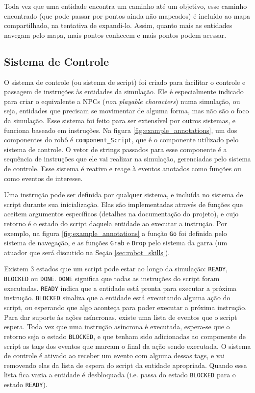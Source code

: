 Toda vez que uma entidade encontra um caminho até um objetivo, esse caminho encontrado (que pode passar por pontos ainda não mapeados) é incluído ao mapa compartilhado, na tentativa de expandi-lo. Assim, quanto mais as entidades navegam pelo mapa, mais pontos conhecem e mais pontos podem acessar.

\subsection{Sistema de Controle}
\label{sec:scripting}

O sistema de controle (ou sistema de script) foi criado para facilitar o controle e passagem de instruções às entidades da simulação. Ele é especialmente indicado para criar o equivalente a NPCs (\textit{non playable characters}) numa simulação, ou seja, entidades que precisam se movimentar de alguma forma, mas não são o foco da simulação. Esse sistema foi feito para ser extensível por outros sistemas, e funciona baseado em instruções. Na figura \ref{fig:example_annotations}, um dos componentes do robô é \texttt{component\_Script}, que é o componente utilizado pelo sistema de controle. O vetor de strings passados para esse componente é a sequência de instruções que ele vai realizar na simulação, gerenciadas pelo sistema de controle. Esse sistema é reativo e reage à eventos anotados como funções ou como eventos de interesse.

Uma instrução pode ser definida por qualquer sistema, e incluída no sistema de script durante sua inicialização. Elas são implementadas através de funções que aceitem argumentos específicos (detalhes na documentação do projeto), e cujo retorno é o estado do script daquela entidade ao executar a instrução. Por exemplo, na figura \ref{fig:example_annotations} a função \texttt{Go} foi definida pelo sistema de navegação, e as funções \texttt{Grab} e \texttt{Drop} pelo sistema da garra (um atuador que será discutido na Seção \ref{sec:robot_skills}).

Existem 3 estados que um script pode estar ao longo da simulação: \texttt{READY}, \texttt{BLOCKED} ou \texttt{DONE}. \texttt{DONE} significa que todas as instruções do script foram executadas. \texttt{READY} indica que a entidade está pronta para executar a próxima instrução. \texttt{BLOCKED} sinaliza que a entidade está executando alguma ação do script, ou esperando que algo aconteça para poder executar a próxima instrução. Para dar suporte às ações asíncronas, existe uma lista de eventos que o script espera. Toda vez que uma instrução asíncrona é executada, espera-se que o retorno seja o estado \texttt{BLOCKED}, e que tenham sido adicionadas ao componente de script as tags dos eventos que marcam o final da ação sendo executada. O sistema de controle é ativado ao receber um evento com alguma dessas tags, e vai removendo elas da lista de espera do script da entidade apropriada. Quando essa lista fica vazia a entidade é desbloquada (i.e. passa do estado \texttt{BLOCKED} para o estado \texttt{READY}).


